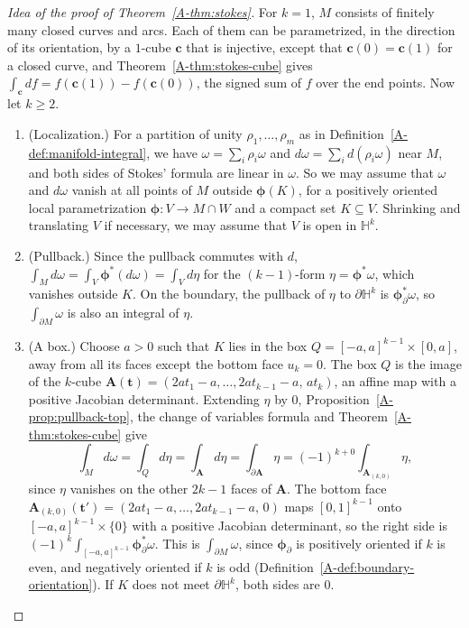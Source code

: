 \begin{proof}[Idea of the proof of Theorem~\ref{A-thm:stokes}]
    For $k = 1$, $M$ consists of finitely many closed curves and arcs. Each of them can be parametrized, in the direction of its orientation, by a $1$-cube $\mathbf{c}$ that is injective, except that $\mathbf{c}(0) = \mathbf{c}(1)$ for a closed curve, and Theorem~\ref{A-thm:stokes-cube} gives $\int_{\mathbf{c}} df = f(\mathbf{c}(1)) - f(\mathbf{c}(0))$, the signed sum of $f$ over the end points. Now let $k \geq 2$.
    \begin{enumerate}
        \item (Localization.) For a partition of unity $\rho_1, \ldots, \rho_m$ as in Definition~\ref{A-def:manifold-integral}, we have $\omega = \sum_i \rho_i\omega$ and $d\omega = \sum_i d(\rho_i\omega)$ near $M$, and both sides of Stokes' formula are linear in $\omega$. So we may assume that $\omega$ and $d\omega$ vanish at all points of $M$ outside $\boldsymbol{\phi}(K)$, for a positively oriented local parametrization $\boldsymbol{\phi}: V \to M \cap W$ and a compact set $K \subseteq V$. Shrinking and translating $V$ if necessary, we may assume that $V$ is open in $\mathbb{H}^k$.
        \item (Pullback.) Since the pullback commutes with $d$, $\int_M d\omega = \int_V \boldsymbol{\phi}^*(d\omega) = \int_V d\eta$ for the $(k - 1)$-form $\eta = \boldsymbol{\phi}^*\omega$, which vanishes outside $K$. On the boundary, the pullback of $\eta$ to $\partial\mathbb{H}^k$ is $\boldsymbol{\phi}_\partial^*\omega$, so $\int_{\partial M} \omega$ is also an integral of $\eta$.
        \item (A box.) Choose $a > 0$ such that $K$ lies in the box $Q = [-a, a]^{k-1} \times [0, a]$, away from all its faces except the bottom face $u_k = 0$. The box $Q$ is the image of the $k$-cube $\mathbf{A}(\mathbf{t}) = (2at_1 - a, \ldots, 2at_{k-1} - a, \, at_k)$, an affine map with a positive Jacobian determinant. Extending $\eta$ by $0$, Proposition~\ref{A-prop:pullback-top}, the change of variables formula and Theorem~\ref{A-thm:stokes-cube} give
        \[\int_M d\omega = \int_Q d\eta = \int_{\mathbf{A}} d\eta = \int_{\partial\mathbf{A}} \eta = (-1)^{k + 0}\int_{\mathbf{A}_{(k, 0)}} \eta,\]
        since $\eta$ vanishes on the other $2k - 1$ faces of $\mathbf{A}$. The bottom face $\mathbf{A}_{(k, 0)}(\mathbf{t}') = (2at_1 - a, \ldots, 2at_{k-1} - a, \, 0)$ maps $[0, 1]^{k-1}$ onto $[-a, a]^{k-1} \times \{0\}$ with a positive Jacobian determinant, so the right side is $(-1)^k \int_{[-a, a]^{k-1}} \boldsymbol{\phi}_\partial^*\omega$. This is $\int_{\partial M} \omega$, since $\boldsymbol{\phi}_\partial$ is positively oriented if $k$ is even, and negatively oriented if $k$ is odd (Definition~\ref{A-def:boundary-orientation}). If $K$ does not meet $\partial\mathbb{H}^k$, both sides are $0$.

\end{enumerate}
\end{proof}
